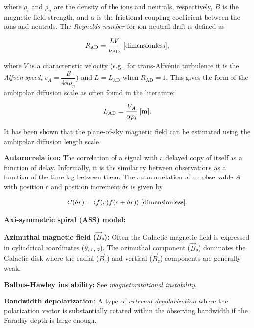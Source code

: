 \documentclass[a4paper,10pt]{article}
\begin{document}
{\noindent}where $\rho_i$ and $\rho_n$ are the density of the ions and neutrals, respectively, $B$ is the magnetic field strength, and $\alpha$ is the frictional coupling coefficient between the ions and neutrals. The \textit{Reynolds number} for ion-neutral drift is defined as

\begin{align*}
    R_\mathrm{AD} = \frac{LV}{\nu_\mathrm{AD}} ~ [{\rm dimensionless}],
\end{align*}

{\noindent}where $V$ is a characteristic velocity (e.g., for trans-Alfv\'enic turbulence it is the \textit{Alfv\'en speed}, $v_A = \dfrac{B}{4\pi\rho_n}$) and $L=L_\mathrm{AD}$ when $R_\mathrm{AD}=1$. This gives the form of the ambipolar diffusion scale as often found in the literature:

\begin{align*}
    L_\mathrm{AD} = \frac{V_A}{\alpha\rho_i} ~ [{\rm m}].
\end{align*}

{\noindent}It has been shown that the plane-of-sky magnetic field can be estimated using the ambipolar diffusion length scale. 

{\noindent}\textbf{Autocorrelation:} The correlation of a signal with a delayed copy of itself as a function of delay. Informally, it is the similarity between observations as a function of the time lag between them. The autocorrelation of an observable $A$ with position $r$ and position increment $\delta r$ is given by

\begin{align*}
    C(\delta r) = \langle f(r)f(r+\delta r)\rangle ~ [{\rm dimensionless}].
\end{align*}

{\noindent}\textbf{Axi-symmetric spiral (ASS) model:}

{\noindent}\textbf{Azimuthal magnetic field ($\vec{B}_\theta$):} Often the Galactic magnetic field is expressed in cylindrical coordinates ($\theta, r, z$). The azimuthal component ($\vec{B}_\theta$) dominates the Galactic disk where the radial ($\vec{B}_r$) and vertical ($\vec{B}_z$) components are generally weak.

{\noindent}\textbf{Balbus-Hawley instability:} See \textit{magnetorotational instability}.

{\noindent}\textbf{Bandwidth depolarization:} A type of \textit{external depolarization} where the polarization vector is substantially rotated within the observing bandwidth if the Faraday depth is large enough.
\end{document}
